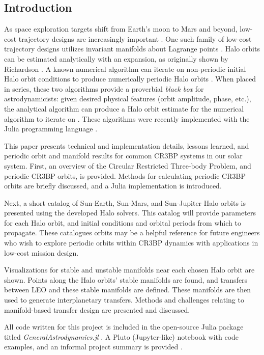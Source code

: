 \documentclass[conf]{new-aiaa}
\begin{document}
\begin{multicols}{2}
\section{Introduction}
As space exploration targets shift from Earth's moon to Mars and 
beyond, low-cost trajectory designs are increasingly important 
\cite{nasa2020artemis}. One such family of low-cost trajectory 
designs utilizes invariant manifolds about Lagrange points
\cite{rund2018interplanetary}. Halo orbits can be estimated 
analytically with an expansion, as originally shown by Richardson 
\cite{richardson1980analytical} \cite{koon2008dynamical}. A known
numerical algorithm can iterate on non-periodic initial Halo orbit 
conditions to produce numerically periodic Halo orbits
\cite{howell1984three}. When placed in series, these two algorithms 
provide a proverbial \textit{black box} for astrodynamicists: 
given desired physical features (orbit amplitude, phase, etc.), 
the analytical algorithm can produce a Halo orbit estimate for the
numerical algorithm to iterate on \cite{rund2018interplanetary}.
These algorithms were recently implemented with the Julia 
programming language \cite{carpinelli2020halos} 
\cite{carpinelli2020astro} \cite{bezanson2017julia}. 

This paper presents technical and implementation details, lessons learned,
and periodic orbit and manifold results for common CR3BP systems in 
our solar system. 
First, an overview of the Circular Restricted Three-body Problem,
and periodic CR3BP orbits, is provided. Methods for calculating
periodic CR3BP orbits are briefly discussed, and a Julia 
implementation is introduced. 

Next, a short catalog of Sun-Earth, Sun-Mars, and Sun-Jupiter 
Halo orbits is presented using the developed Halo solvers.
This catalog will provide parameters for each Halo orbit, 
and initial conditions and orbital periods from which to propagate.
These catalogues orbits may be a helpful reference for future 
engineers who wish to explore periodic orbits within CR3BP dynamics
with applications in low-cost mission design.

Visualizations for stable and unstable 
manifolds near each chosen Halo orbit are shown. Points along the 
Halo orbits' stable manifolds are found, and 
transfers between LEO and these stable manifolds are defined. 
These manifolds are then used to generate interplanetary 
transfers. Methods and challenges relating to manifold-based 
transfer design are presented and discussed. 

All code written for this project is included in the open-source 
Julia package titled \textit{GeneralAstrodynamics.jl} \cite{carpinelli2020astro}.
A Pluto (Jupyter-like) notebook with code examples, and an informal 
project summary is provided 
\cite{fosnp2020Pluto} \cite{carpinelli2020halos}.


\end{multicols}
\end{document}

